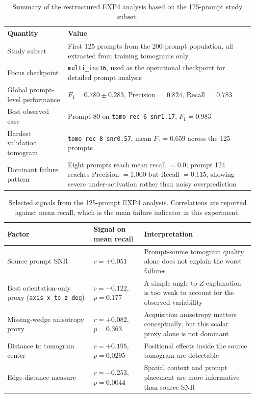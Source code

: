 \documentclass[12pt,a4paper]{report}
\begin{document}
\begin{table}[H]
  \centering
  \small
  \begin{tabularx}{\textwidth}{l Y}
    \toprule
    Quantity & Value \\
    \midrule
    Study subset & First 125 prompts from the 200-prompt population, all extracted from training tomograms only \\
    Focus checkpoint & \texttt{multi\_inc16}, used as the operational checkpoint for detailed prompt analysis \\
    Global prompt-level performance & \(F_1 = 0.780 \pm 0.283\), Precision \(=0.824\), Recall \(=0.783\) \\
    Best observed case & Prompt 80 on \texttt{tomo\_rec\_6\_snr1.17}, \(F_1 = 0.983\) \\
    Hardest validation tomogram & \texttt{tomo\_rec\_8\_snr0.57}, mean \(F_1 = 0.659\) across the 125 prompts \\
    Dominant failure pattern & Eight prompts reach mean recall \(=0.0\); prompt 124 reaches Precision \(=1.000\) but Recall \(=0.115\), showing severe under-activation rather than noisy overprediction \\
    \bottomrule
  \end{tabularx}
  \caption{Summary of the restructured EXP4 analysis based on the 125-prompt study subset.}
  \label{tab:exp4-summary}
\end{table}

\begin{table}[H]
  \centering
  \small
  \begin{tabularx}{\textwidth}{>{\raggedright\arraybackslash}p{} >{\raggedright\arraybackslash}p{} Y}
    \toprule
    Factor & Signal on mean recall & Interpretation \\
    \midrule
    Source prompt SNR & \(r = +0.051\) & Prompt-source tomogram quality alone does not explain the worst failures \\
    Best orientation-only proxy (\texttt{axis\_x\_to\_z\_deg}) & \(r = -0.122\), \(p = 0.177\) & A simple angle-to-\(Z\) explanation is too weak to account for the observed variability \\
    Missing-wedge anisotropy proxy & \(r = +0.082\), \(p = 0.363\) & Acquisition anisotropy matters conceptually, but this scalar proxy alone is not dominant \\
    Distance to tomogram center & \(r = +0.195\), \(p = 0.0295\) & Positional effects inside the source tomogram are detectable \\
    Edge-distance measure & \(r = -0.253\), \(p = 0.0044\) & Spatial context and prompt placement are more informative than source SNR \\
    \bottomrule
  \end{tabularx}
  \caption{Selected signals from the 125-prompt EXP4 analysis. Correlations are reported against mean recall, which is the main failure indicator in this experiment.}
  \label{tab:exp4-signals}
\end{table}
\end{document}
